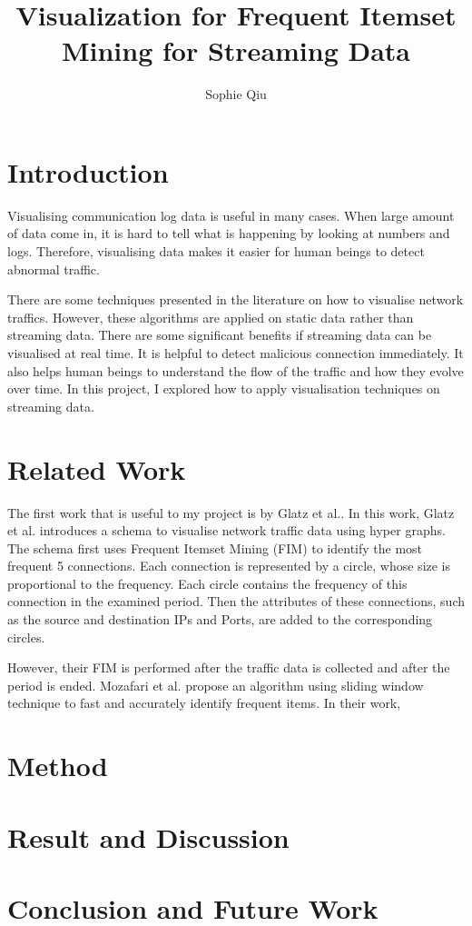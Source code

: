 \documentclass[11pt, oneside]{article}   	%
\begin{document}
\title{Visualization for Frequent Itemset Mining for Streaming Data}
\author{Sophie Qiu}


\maketitle
\section{Introduction}

Visualising communication log data is useful in many cases. When large amount of data come in, it is hard to tell what is happening by looking at numbers and logs. Therefore, visualising data makes it easier for human beings to detect abnormal traffic. 

There are some techniques presented in the literature on how to visualise network traffics. However, these algorithms are applied on static data rather than streaming data. There are some significant benefits if streaming data can be visualised at real time. It is helpful to detect malicious connection immediately. It also helps human beings to understand the flow of the traffic and how they evolve over time. In this project, I explored how to apply visualisation techniques on streaming data.

\section{Related Work}

The first work that is useful to my project is by Glatz et al.\cite {vis}. In this work, Glatz et al. introduces a schema to visualise network traffic data using hyper graphs. The schema first uses Frequent Itemset Mining (FIM) to identify the most frequent 5 connections. Each connection is represented by a circle, whose size is proportional to the frequency. Each circle contains the frequency of this connection in the examined period. Then the attributes of these connections, such as the source and destination IPs and Ports, are added to the corresponding circles. 

However, their FIM is performed after the traffic data is collected and after the period is ended. Mozafari et al. propose an algorithm using sliding window technique to fast and accurately identify frequent items. In their work, 

\section{Method}
\section{Result and Discussion}
\section{Conclusion and Future Work}
\end{document}
